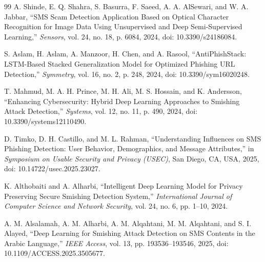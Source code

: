 \documentclass[conference]{IEEEtran}
\begin{document}
\begin{thebibliography}{99}
 A. Shinde, E. Q. Shahra, S. Basurra, F. Saeed, A. A. AlSewari, and W. A. Jabbar, ``SMS Scam Detection Application Based on Optical Character Recognition for Image Data Using Unsupervised and Deep Semi-Supervised Learning,'' \textit{Sensors}, vol. 24, no. 18, p. 6084, 2024, doi: 10.3390/s24186084.

 S. Aslam, H. Aslam, A. Manzoor, H. Chen, and A. Rasool, ``AntiPhishStack: LSTM-Based Stacked Generalization Model for Optimized Phishing URL Detection,'' \textit{Symmetry}, vol. 16, no. 2, p. 248, 2024, doi: 10.3390/sym16020248.

 T. Mahmud, M. A. H. Prince, M. H. Ali, M. S. Hossain, and K. Andersson, ``Enhancing Cybersecurity: Hybrid Deep Learning Approaches to Smishing Attack Detection,'' \textit{Systems}, vol. 12, no. 11, p. 490, 2024, doi: 10.3390/systems12110490.

 D. Timko, D. H. Castillo, and M. L. Rahman, ``Understanding Influences on SMS Phishing Detection: User Behavior, Demographics, and Message Attributes,'' in \textit{Symposium on Usable Security and Privacy (USEC)}, San Diego, CA, USA, 2025, doi: 10.14722/usec.2025.23027.

 K. Althobaiti and A. Alharbi, ``Intelligent Deep Learning Model for Privacy Preserving Secure Smishing Detection System,'' \textit{International Journal of Computer Science and Network Security}, vol. 24, no. 6, pp. 1--10, 2024.

 A. M. Alsalamah, A. M. Alharbi, A. M. Alqahtani, M. M. Alqahtani, and S. I. Alayed, ``Deep Learning for Smishing Attack Detection on SMS Contents in the Arabic Language,'' \textit{IEEE Access}, vol. 13, pp. 193536--193546, 2025, doi: 10.1109/ACCESS.2025.3505677.

\end{thebibliography}
\end{document}
